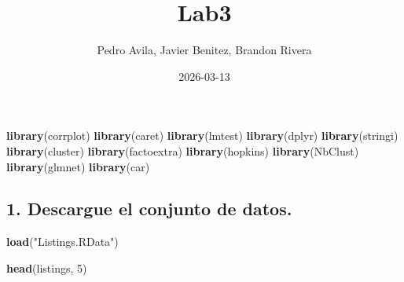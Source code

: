 \documentclass[
]{article}
\title{Lab3}
\author{Pedro Avila, Javier Benitez, Brandon Rivera}
\date{2026-03-13}
\newenvironment{Shaded}{\begin{snugshade}}{\end{snugshade}}
\newcommand{\DecValTok}[1]{\textcolor[rgb]{0.00,0.00,0.81}{#1}}
\newcommand{\FunctionTok}[1]{\textcolor[rgb]{0.13,0.29,0.53}{\textbf{#1}}}
\newcommand{\NormalTok}[1]{#1}
\newcommand{\StringTok}[1]{\textcolor[rgb]{0.31,0.60,0.02}{#1}}
\begin{document}
\maketitle

\begin{Shaded}
\begin{Highlighting}[]
\FunctionTok{library}\NormalTok{(corrplot)}
\FunctionTok{library}\NormalTok{(caret)}
\FunctionTok{library}\NormalTok{(lmtest)}
\FunctionTok{library}\NormalTok{(dplyr)}
\FunctionTok{library}\NormalTok{(stringi)}
\FunctionTok{library}\NormalTok{(cluster)}
\FunctionTok{library}\NormalTok{(factoextra)}
\FunctionTok{library}\NormalTok{(hopkins)}
\FunctionTok{library}\NormalTok{(NbClust)}
\FunctionTok{library}\NormalTok{(glmnet)}
\FunctionTok{library}\NormalTok{(car)}
\end{Highlighting}
\end{Shaded}

\subsection{1. Descargue el conjunto de
datos.}\label{descargue-el-conjunto-de-datos.}

\begin{Shaded}
\begin{Highlighting}[]
\FunctionTok{load}\NormalTok{(}\StringTok{"Listings.RData"}\NormalTok{)}

\FunctionTok{head}\NormalTok{(listings, }\DecValTok{5}\NormalTok{)}
\end{Highlighting}
\end{Shaded}
\end{document}
